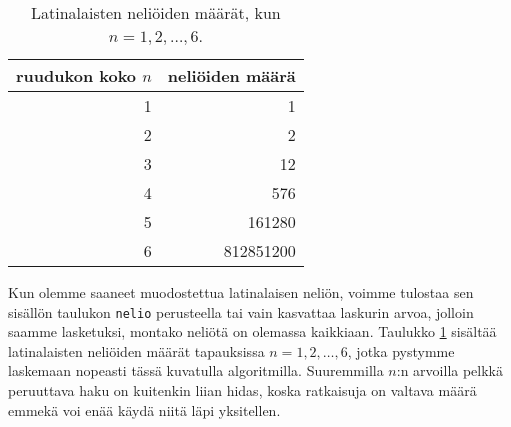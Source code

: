\begin{table}
\center
\begin{tabular}{rr}
ruudukon koko $n$ & neliöiden määrä \\
\hline
1 & 1 \\
2 & 2 \\
3 & 12 \\
4 & 576 \\
5 & 161280 \\
6 & 812851200 \\
\end{tabular}
\caption{Latinalaisten neliöiden määrät, kun $n=1,2,\dots,6$.}
\label{tab:latnel}
\end{table}

Kun olemme saaneet muodostettua latinalaisen neliön, voimme
tulostaa sen sisällön taulukon \texttt{nelio} perusteella
tai vain kasvattaa laskurin arvoa,
jolloin saamme lasketuksi, montako neliötä on olemassa kaikkiaan.
Taulukko \ref{tab:latnel} sisältää latinalaisten neliöiden
määrät tapauksissa $n=1,2,\dots,6$, jotka pystymme laskemaan
nopeasti tässä kuvatulla algoritmilla.
Suuremmilla $n$:n arvoilla pelkkä peruuttava haku
on kuitenkin liian hidas, koska ratkaisuja on valtava määrä
emmekä voi enää käydä niitä läpi yksitellen.
